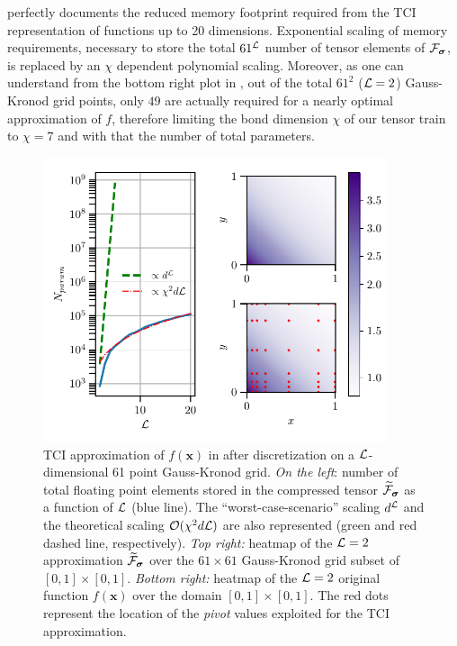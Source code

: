 \begin{example}
 perfectly documents the reduced memory footprint required from the TCI representation of functions up to 20 dimensions. Exponential scaling of memory requirements, necessary to store the total $61^{\mathcal{L}}$ number of tensor elements of $\mathcal{F}_{\boldsymbol{\sigma}}$, is replaced by an $\chi$ dependent polynomial scaling. Moreover, as one can understand from the bottom right plot in , out of the total $61^2$ ($\mathcal{L}=2$) Gauss-Kronod grid points, only $49$ are actually required for a nearly optimal approximation of $f$, therefore limiting the bond dimension $\chi$ of our tensor train to $\chi = 7$ and with that the number of total parameters. 
\begin{figure}[ht!]
		\centering
		\includegraphics[width=0.9\textwidth]{figures/TCI_memory_scaling+heatmap.pdf}
		\caption{TCI approximation of $f(\boldsymbol{x})$ in  after discretization on a $\mathcal{L}$-dimensional 61 point Gauss-Kronod grid. \textit{On the left}: number of total floating point elements stored in the compressed tensor $\widetilde{\mathcal{F}}_{\boldsymbol{\sigma}}$ as a function of $\mathcal{L}$ (blue line). The ``worst-case-scenario'' scaling $d^{\mathcal{L}}$ and the theoretical scaling $\mathcal{O} (\chi^2d\mathcal{L})$ are also represented (green and red dashed line, respectively). \textit{Top right:} heatmap of the $\mathcal{L} = 2$ approximation $\widetilde{\mathcal{F}}_{\boldsymbol{\sigma}}$ over the $61\times61$ Gauss-Kronod grid subset of $[0,1]\times[0,1]$. \textit{Bottom right:} heatmap of the $\mathcal{L} = 2$ original function  $f(\boldsymbol{x})$ over the domain $[0,1]\times[0,1]$. The red dots represent the location of the \textit{pivot} values exploited for the TCI approximation.
		}
		\label{fig:TCIscaling}
	\end{figure}
\label{ex:Ldimfunc}
\end{example}


